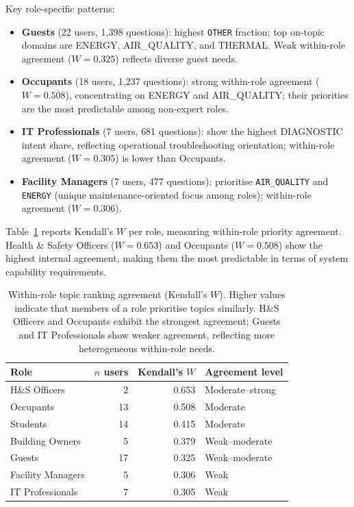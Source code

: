 \documentclass[acmsmall]{acmart}
\begin{document}
Key role-specific patterns:
\begin{itemize}
    \item \textbf{Guests} (22 users, 1{,}398 questions): highest \texttt{OTHER} fraction; top on-topic domains are ENERGY, AIR\_QUALITY, and THERMAL. Weak within-role agreement ($W=0.325$) reflects diverse guest needs.
    \item \textbf{Occupants} (18 users, 1{,}237 questions): strong within-role agreement ($W=0.508$), concentrating on ENERGY and AIR\_QUALITY; their priorities are the most predictable among non-expert roles.
    \item \textbf{IT Professionals} (7 users, 681 questions): show the highest DIAGNOSTIC intent share, reflecting operational troubleshooting orientation; within-role agreement ($W=0.305$) is lower than Occupants.
    \item \textbf{Facility Managers} (7 users, 477 questions): prioritise \texttt{AIR\_QUALITY} and \texttt{ENERGY} (unique maintenance-oriented focus among roles); within-role agreement ($W=0.306$).
\end{itemize}

Table~\ref{tab:concordance} reports Kendall's $W$ per role, measuring within-role priority agreement. Health \& Safety Officers ($W=0.653$) and Occupants ($W=0.508$) show the highest internal agreement, making them the most predictable in terms of system capability requirements.

\begin{table}[t]
\centering
\caption{Within-role topic ranking agreement (Kendall's $W$). Higher values indicate that members of a role prioritise topics similarly. H\&S Officers and Occupants exhibit the strongest agreement; Guests and IT Professionals show weaker agreement, reflecting more heterogeneous within-role needs.}
\label{tab:concordance}
\small
\begin{tabular}{@{}lrrl@{}}
\toprule
\textbf{Role} & \textbf{$n$ users} & \textbf{Kendall's $W$} & \textbf{Agreement level} \\
\midrule
H\&S Officers               & 2  & 0.653 & Moderate--strong \\
Occupants                    & 13 & 0.508 & Moderate \\
Students                     & 14 & 0.415 & Moderate \\
Building Owners              & 5  & 0.379 & Weak--moderate \\
Guests                       & 17 & 0.325 & Weak--moderate \\
Facility Managers            & 5  & 0.306 & Weak \\
IT Professionals             & 7  & 0.305 & Weak \\
\bottomrule
\end{tabular}
\end{table}
\end{document}
